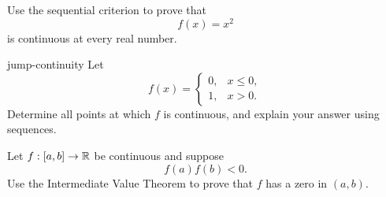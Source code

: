 \begin{exercise}
Use the sequential criterion to prove that
\[
f(x)=x^2
\]
is continuous at every real number.
\end{exercise}

\begin{hexercise}{jump-continuity}
Let
\[
f(x)=
\begin{cases}
0,&x\leq0,\\
1,&x>0.
\end{cases}
\]
Determine all points at which $f$ is continuous, and explain your answer using sequences.
\end{hexercise}

\begin{exercise}
Let $f:[a,b]\to\mathbb{R}$ be continuous and suppose
\[
f(a)f(b)<0.
\]
Use the Intermediate Value Theorem to prove that $f$ has a zero in $(a,b)$.
\end{exercise}
